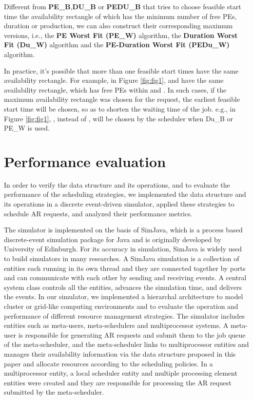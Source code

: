\documentclass[preprint,12pt]{elsarticle}
\begin{document}
Different from \textbf{PE\_B},\textbf{DU\_B} or \textbf{PEDU\_B} that tries to choose feasible start time the availability rectangle of which has the minimum number of free PEs, duration or production, we can also construct their corresponding maximum versions, i.e., the \textbf{PE  Worst Fit (PE\_W)} algorithm, the \textbf{Duration Worst Fit (Du\_W)} algorithm and the \textbf{PE-Duration Worst Fit (PEDu\_W)} algorithm.

In practice, it's possible that more than one feasible start times have the same availability rectangle. For example, in Figure \ref{fig:fig1},  and  have the same availability rectangle, which has  free PEs within  and . In such cases, if the maximum availability rectangle was chosen for the request, the earliest feasible start time will be chosen, so as to shorten the waiting time of the job. e.g., in Figure \ref{fig:fig1}, , instead of , will be chosen by the scheduler when Du\_B or PE\_W is used.


\section{Performance evaluation}

In order to verify the data structure and its operations, and to evaluate the performance of the scheduling strategies, we implemented the data structure and its operations in a discrete event-driven simulator, applied these strategies to schedule AR requests, and analyzed their performance metrics.

The simulator is implemented on the basis of SimJava\cite{simjava}, which is a process based discrete-event simulation package for Java and is originally developed by University of Edinburgh. For its accuracy in simulation, SimJava is widely used to build simulators in many researches. A SimJava simulation is a collection of entities each running in its own thread and they are connected together by ports and can communicate with each other by sending and receiving events. A central system class controls all the entities, advances the simulation time, and delivers the events. In our simulator, we implemented a hierarchal architecture to model cluster or grid-like computing environments and to evaluate the operation and performance of different resource management strategies. The simulator includes entities such as meta-users, meta-schedulers and multiprocessor systems. A meta-user is responsible for generating AR requests and submit them to the job queue of the meta-scheduler, and the meta-scheduler links to multiprocessor entities and manages their availability information via the data structure proposed in this paper and allocate resources according to the scheduling policies. In a multiprocessor entity, a local scheduler entity and multiple processing element entities were created and they are responsible for processing the AR request submitted by the meta-scheduler.
\end{document}
